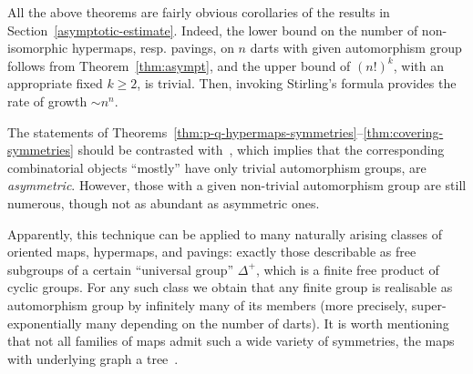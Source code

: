\documentclass[ALCO,ThmDefs,Unicode,epreuves]{cedram}
\begin{document}
All the above theorems are fairly obvious corollaries of the results in Section~\ref{asymptotic-estimate}. Indeed, the lower bound on the number of non-isomorphic hypermaps, resp. pavings, on $n$ darts with given automorphism group follows from Theorem~\ref{thm:asympt}, and the upper bound of $(n!)^k$, with an appropriate fixed $k\geq 2$, is trivial. Then, invoking Stirling's formula provides the rate of growth $\sim n^n$.

The statements of Theorems~\ref{thm:p-q-hypermaps-symmetries}--\ref{thm:covering-symmetries} should be contrasted with~\cite[Lemma~1]{Drmota-Nedela}, which implies that the corresponding combinatorial objects ``mostly'' have only trivial automorphism groups, \ie are \emph{asymmetric}. However, those with a given non-trivial automorphism group are still numerous, though not as abundant as asymmetric ones. 

Apparently, this technique can be applied to many naturally arising classes of oriented maps, hypermaps, and pavings: exactly those describable as free subgroups of a certain ``universal group'' $\Delta^+$, which is a finite free product of cyclic groups. For any such class we obtain that any finite group is realisable as automorphism group by infinitely many of its members (more precisely, super-exponentially many depending on the number of darts). It is worth mentioning that not all families of maps admit such a wide variety of symmetries, \eg the maps with underlying graph a tree~\cite{F}. 




\end{document}
